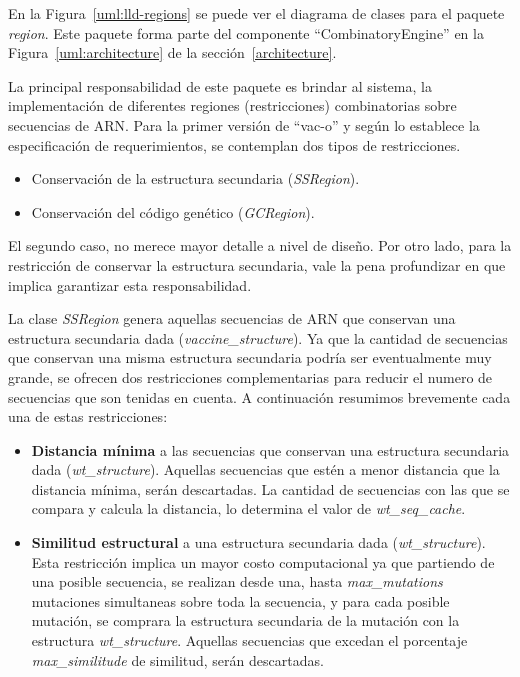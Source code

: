   En la Figura~\ref{uml:lld-regions} se puede ver el diagrama de clases
para el paquete \textit{region}. Este paquete forma parte del componente
``CombinatoryEngine'' en la Figura~\ref{uml:architecture} de la
secci\'on~\ref{architecture}.

  La principal responsabilidad de este paquete es brindar al sistema, la
implementaci\'on de diferentes regiones (restricciones) combinatorias sobre
secuencias de ARN. Para la primer versi\'on de ``vac-o'' y seg\'un lo establece
la especificaci\'on de requerimientos, se contemplan dos tipos de restricciones.
  \begin{itemize}
   \item Conservaci\'on de la estructura secundaria (\textit{SSRegion}).
   \item Conservaci\'on del c\'odigo gen\'etico (\textit{GCRegion}).
  \end{itemize}

  El segundo caso, no merece mayor detalle a nivel de dise\~no. Por otro lado,
para la restricci\'on de conservar la estructura secundaria, vale la pena
profundizar en que implica garantizar esta responsabilidad.

  La clase \textit{SSRegion} genera aquellas secuencias de ARN que conservan
una estructura secundaria dada (\textit{vaccine\_structure}). Ya que la cantidad
de secuencias que conservan una misma estructura secundaria podr\'ia ser
eventualmente muy grande, se ofrecen dos restricciones complementarias para
reducir el numero de secuencias que son tenidas en cuenta. A continuaci\'on
resumimos brevemente cada una de estas restricciones:

  \begin{itemize}
   \item \textbf{Distancia m\'inima} a las secuencias que conservan una
estructura secundaria dada (\textit{wt\_structure}). Aquellas secuencias que
est\'en a menor distancia que la distancia m\'inima, ser\'an descartadas. La
cantidad de secuencias con las que se compara y calcula la distancia, lo
determina el valor de \textit{wt\_seq\_cache}.
  
  \item \textbf{Similitud estructural} a una estructura secundaria dada
(\textit{wt\_structure}). Esta restricci\'on implica un mayor costo
computacional ya que partiendo de una posible secuencia, se realizan desde una,
hasta \textit{max\_mutations} mutaciones simultaneas sobre toda la secuencia, y
para cada posible mutaci\'on, se comprara la estructura secundaria de la
mutaci\'on con la estructura \textit{wt\_structure}. Aquellas secuencias que
excedan el porcentaje \textit{max\_similitude} de similitud, ser\'an
descartadas.
  \end{itemize}

